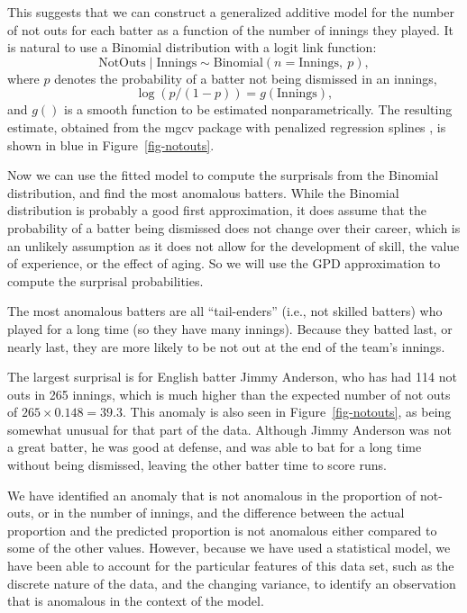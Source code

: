 \documentclass[
  12pt]{article}
\theoremstyle{plain}
\theoremstyle{plain}
\theoremstyle{definition}
\theoremstyle{plain}
\theoremstyle{remark}
\begin{document}
This suggests that we can construct a generalized additive model
\citep{Wood2017gam} for the number of not outs for each batter as a
function of the number of innings they played. It is natural to use a
Binomial distribution with a logit link function: \[
  \text{NotOuts} \mid \text{Innings} \sim \text{Binomial}(n=\text{Innings},~ p),
\] where \(p\) denotes the probability of a batter not being dismissed
in an innings, \[
  \log(p / (1- p)) = g(\text{Innings}),
\] and \(g()\) is a smooth function to be estimated nonparametrically.
The resulting estimate, obtained from the mgcv package with penalized
regression splines \citep{mgcv}, is shown in blue in
Figure~\ref{fig-notouts}.

Now we can use the fitted model to compute the surprisals from the
Binomial distribution, and find the most anomalous batters. While the
Binomial distribution is probably a good first approximation, it does
assume that the probability of a batter being dismissed does not change
over their career, which is an unlikely assumption as it does not allow
for the development of skill, the value of experience, or the effect of
aging. So we will use the GPD approximation to compute the surprisal
probabilities.

The most anomalous batters are all ``tail-enders'' (i.e., not skilled
batters) who played for a long time (so they have many innings). Because
they batted last, or nearly last, they are more likely to be not out at
the end of the team's innings.

The largest surprisal is for English batter Jimmy Anderson, who has had
114 not outs in 265 innings, which is much higher than the expected
number of not outs of \(265 \times 0.148 = 39.3\). This anomaly is also
seen in Figure~\ref{fig-notouts}, as being somewhat unusual for that
part of the data. Although Jimmy Anderson was not a great batter, he was
good at defense, and was able to bat for a long time without being
dismissed, leaving the other batter time to score runs.

We have identified an anomaly that is not anomalous in the proportion of
not-outs, or in the number of innings, and the difference between the
actual proportion and the predicted proportion is not anomalous either
compared to some of the other values. However, because we have used a
statistical model, we have been able to account for the particular
features of this data set, such as the discrete nature of the data, and
the changing variance, to identify an observation that is anomalous in
the context of the model.
\end{document}
